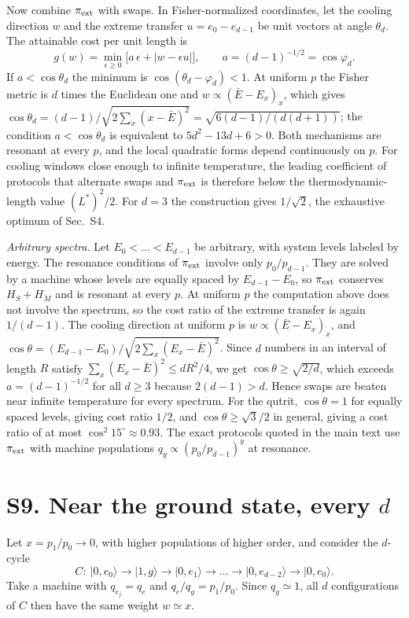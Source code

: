 \documentclass[aps,prl,reprint,superscriptaddress,amsmath,amssymb]{revtex4-2}
\begin{document}
Now combine $\pi_{\rm ext}$ with swaps. In Fisher-normalized coordinates, let the cooling direction $w$ and the
extreme transfer $u=e_0-e_{d-1}$ be unit vectors at angle $\theta_d$. The attainable cost per unit length is
\[
g(w)=\min_{\epsilon\geq0}\big[a\,\epsilon+|w-\epsilon u|\big],\qquad a=(d-1)^{-1/2}=\cos\varphi_d .
\]
If $a<\cos\theta_d$ the minimum is $\cos(\theta_d-\varphi_d)<1$. At uniform $p$ the Fisher metric is $d$ times the
Euclidean one and $w\propto(\bar E-E_x)_x$, which gives
$\cos\theta_d=(d-1)/\sqrt{2\sum_x(x-\bar E)^2}=\sqrt{6(d-1)/(d(d+1))}$; the condition $a<\cos\theta_d$ is equivalent to
$5d^2-13d+6>0$. Both mechanisms are resonant at every $p$, and the local quadratic forms depend continuously on $p$.
For cooling windows close enough to infinite temperature, the leading coefficient of protocols that alternate swaps and
$\pi_{\rm ext}$ is therefore below the thermodynamic-length value $(L^*)^2/2$. For $d=3$ the construction gives
$1/\sqrt2$, the exhaustive optimum of Sec.~S4.

\emph{Arbitrary spectra.} Let $E_0<\dots<E_{d-1}$ be arbitrary, with system levels labeled by energy. The resonance
conditions of $\pi_{\rm ext}$ involve only $p_0/p_{d-1}$. They are solved by a machine whose levels are equally spaced by
$E_{d-1}-E_0$, so $\pi_{\rm ext}$ conserves $H_S+H_M$ and is resonant at every $p$. At uniform $p$ the computation above
does not involve the spectrum, so the cost ratio of the extreme transfer is again $1/(d-1)$. The cooling direction at
uniform $p$ is $w\propto(\bar E-E_x)_x$, and $\cos\theta=(E_{d-1}-E_0)/\sqrt{2\sum_x(E_x-\bar E)^2}$. Since $d$ numbers
in an interval of length $R$ satisfy $\sum_x(E_x-\bar E)^2\le dR^2/4$, we get $\cos\theta\geq\sqrt{2/d}$, which exceeds
$a=(d-1)^{-1/2}$ for all $d\geq3$ because $2(d-1)>d$. Hence swaps are beaten near infinite temperature for every
spectrum. For the qutrit, $\cos\theta=1$ for equally spaced levels, giving cost ratio $1/2$, and $\cos\theta\ge\sqrt3/2$
in general, giving a cost ratio of at most $\cos^2 15^\circ\approx0.93$. The exact protocols quoted in the main text use
$\pi_{\rm ext}$ with machine populations $q_y\propto(p_0/p_{d-1})^y$ at resonance.

\section{S9. Near the ground state, every $d$}
Let $x=p_1/p_0\to0$, with higher populations of higher order, and consider the $d$-cycle
\[
C:\ |0,e_0\rangle\to|1,g\rangle\to|0,e_1\rangle\to\dots\to|0,e_{d-2}\rangle\to|0,e_0\rangle .
\]
Take a machine with $q_{e_j}=q_e$ and $q_e/q_g=p_1/p_0$. Since $q_g\simeq1$, all $d$ configurations of $C$ then have the
same weight $w\simeq x$.
\end{document}
